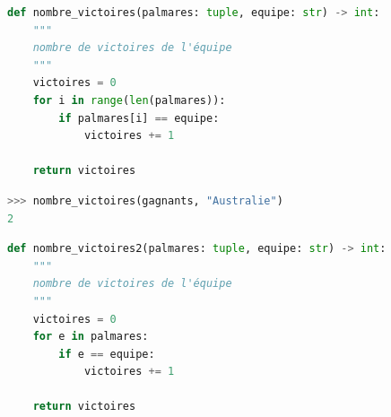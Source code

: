 \documentclass[svgnames,11pt]{beamer}
\begin{document}
\begin{frame}[fragile]
\begin{center}
\begin{lstlisting}[language=Python , basicstyle=\ttfamily\small, xleftmargin=0em, xrightmargin=-1em]
def nombre_victoires(palmares: tuple, equipe: str) -> int:
    """
    nombre de victoires de l'équipe
    """
    victoires = 0
    for i in range(len(palmares)):
        if palmares[i] == equipe:
            victoires += 1

    return victoires
\end{lstlisting}
\label{CODE}
\end{center}   
\begin{center}
\begin{lstlisting}[language=Python , basicstyle=\ttfamily\small, xleftmargin=2em, xrightmargin=2em]
>>> nombre_victoires(gagnants, "Australie")
2
\end{lstlisting}
\label{CODE}
\end{center}
\end{frame}
\begin{frame}[fragile]
\begin{center}
\begin{lstlisting}[language=Python , basicstyle=\ttfamily\small, xleftmargin=0em, xrightmargin=0em]
def nombre_victoires2(palmares: tuple, equipe: str) -> int:
    """
    nombre de victoires de l'équipe
    """
    victoires = 0
    for e in palmares:
        if e == equipe:
            victoires += 1

    return victoires
\end{lstlisting}
\label{CODE}
\end{center}  
\end{frame}
\end{document}
